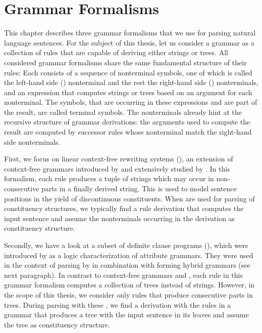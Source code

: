 \documentclass[../document.tex]{subfiles}
\begin{document}
    \chapter{Grammar Formalisms}
    This chapter describes three grammar formalisms that we use for parsing natural language sentences.
    For the subject of this thesis, let us consider a grammar as a collection of rules that are capable of deriving either strings or trees.
    All considered grammar formalisms share the same fundamental structure of their rules:
        Each consists of a sequence of nonterminal symbols, one of which is called the left-hand side () nonterminal and the rest the right-hand side () nonterminals, and an expression that computes strings or trees based on an argument for each  nonterminal.
        The symbols, that are occurring in these expressions and are part of the result, are called terminal symbols.
    The nonterminals already hint at the recursive structure of grammar derivations: the arguments used to compute the result are computed by successor rules whose  nonterminal match the right-hand side nonterminals.


    First, we focus on linear context-free rewriting systems (), an extension of context-free grammars introduced by \citet{VijWeiJos87} and extensively studied by \citet{SekMatFujKas91}.
    In this formalism, each rule produces a tuple of strings which may occur in non-consecutive parts in a finally derived string.
    This is used to model sentence positions in the yield of discontinuous constituents.
    When  are used for parsing of constituency structures, we typically find a rule derivation that computes the input sentence and assume the nonterminals occurring in the derivation as constituency structure.

    Secondly, we have a look at a subset of definite clause programs (), which were introduced by \cite{Der85} as a logic characterization of attribute grammars.
    They were used in the context of parsing by \cite{Ned14,Geb17,Geb20} in combination with  forming hybrid grammars (see next paragraph).
    In contrast to context-free grammars and , each rule in this grammar formalism computes a collection of trees instead of strings.
    However, in the scope of this thesis, we consider only  rules that produce consecutive parts in trees.
    During parsing with these , we find a derivation with the rules in a grammar that produces a tree with the input sentence in its leaves and assume the tree as constituency structure.
\end{document}

